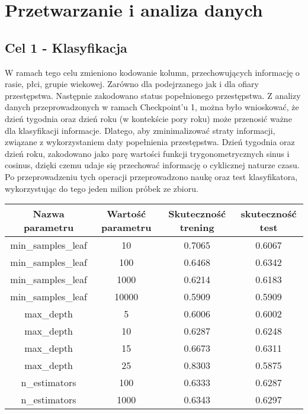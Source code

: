 \documentclass{classrep}
\begin{document}
    \section{Przetwarzanie i analiza danych} {

        \subsection{Cel 1 - Klasyfikacja} {
            W ramach tego celu zmieniono kodowanie kolumn, przechowujących informację o rasie, płci, grupie
            wiekowej. Zarówno dla podejrzanego jak i dla ofiary przestępstwa. Następnie zakodowano status
            popełnionego przestępstwa. Z analizy danych przeprowadzonych w ramach Checkpoint'u 1, można
            było wnioskować, że dzień tygodnia oraz dzień roku (w kontekście pory roku) może przenosić
            ważne dla klasyfikacji informacje. Dlatego, aby zminimalizować straty informacji, związane z
            wykorzystaniem daty popełnienia przestępstwa. Dzień tygodnia oraz dzień roku, zakodowano jako
            parę wartości funkcji trygonometrycznych sinus i cosinus, dzięki czemu udaje się przechować
            informację o cyklicznej naturze czasu.
            Po przeprowadzeniu tych operacji przeprowadzono naukę oraz test klasyfikatora, wykorzystując do
            tego jeden milion próbek ze zbioru.
            \FloatBarrier

            \begin{table}
                \centering
                \begin{tabular}{|c|c|c|c|}
                    \hline
                    Nazwa parametru & Wartość parametru & Skuteczność trening & skuteczność test \\ \hline
                    min\_samples\_leaf & 10 & 0.7065 & 0.6067 \\ \hline
                    min\_samples\_leaf & 100 & 0.6468 & 0.6342 \\ \hline
                    min\_samples\_leaf & 1000 & 0.6214 & 0.6183 \\ \hline
                    min\_samples\_leaf & 10000 & 0.5909 & 0.5909 \\ \hline
                    max\_depth & 5 & 0.6006 & 0.6002 \\ \hline
                    max\_depth & 10 & 0.6287 & 0.6248 \\ \hline
                    max\_depth & 15 & 0.6673 & 0.6311 \\ \hline
                    max\_depth & 25 & 0.8303 & 0.5875 \\ \hline
                    n\_estimators & 100 & 0.6333 & 0.6287 \\ \hline
                    n\_estimators & 1000 & 0.6343 & 0.6297 \\ \hline


\end{tabular}
\end{table}}}
\end{document}
